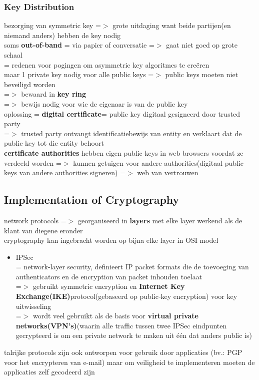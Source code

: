 \documentclass{report}
\begin{document}
\subsubsection{Key Distribution}
bezorging van symmetric key =$>$ grote uitdaging want beide partijen(en niemand anders) hebben de key nodig
\\soms \textbf{out-of-band} = via papier of conversatie =$>$ gaat niet goed op grote schaal
\\= redenen voor pogingen om asymmetric key algoritmes te cre\"eren
\\ maar 1 private key nodig voor alle public keys =$>$ public keys moeten niet beveiligd worden
\\ =$>$ bewaard in \textbf{key ring}
\\ =$>$ bewijs nodig voor wie de eigenaar is van de public key
\\ oplossing = \textbf{digital certificate}= public key digitaal gesigneerd door trusted party
\\=$>$ trusted party ontvangt identificatiebewijs van entity en verklaart dat de public key tot die entity behoort
\\\textbf{certificate authorities} hebben eigen public keys in web browsers voordat ze verdeeld worden =$>$ kunnen getuigen voor andere authorities(digitaal public keys van andere authorities signeren) =$>$ web van vertrouwen

\subsection{Implementation of Cryptography}
network protocols =$>$ georganiseerd in \textbf{layers} met elke layer werkend als de klant van diegene eronder
\\cryptography kan ingebracht worden op bijna elke layer in OSI model
\begin{itemize}
\item IPSec 
\\ = network-layer security, definieert IP packet formats die de toevoeging van authenticators en de encryption van packet inhouden toelaat
\\=$>$ gebruikt symmetric encryption en \textbf{Internet Key Exchange(IKE)}protocol(gebaseerd op public-key encryption) voor key uitwisseling
\\=$>$ wordt veel gebruikt als de basis voor \textbf{virtual private networks(VPN's)}(waarin alle traffic tussen twee IPSec eindpunten gecrypteerd is om een private network te maken uit \'e\'en dat anders public is)
\end{itemize}
talrijke protocols zijn ook ontworpen voor gebruik door applicaties (bv.: PGP voor het encrypteren van e-mail) maar om veiligheid te implementeren moeten de applicaties zelf gecodeerd zijn
\end{document}
